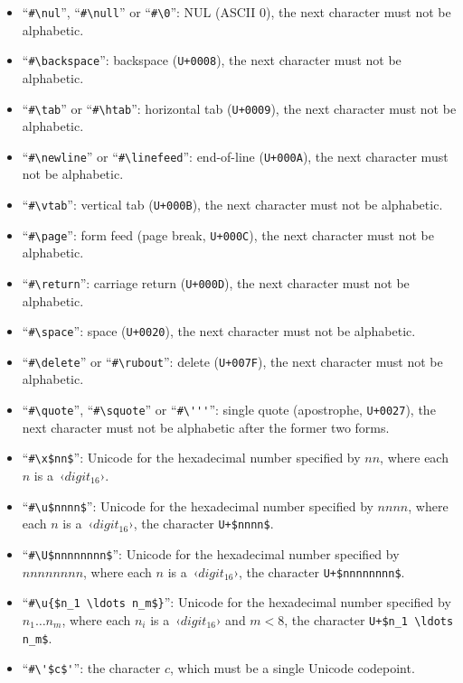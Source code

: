 \begin{itemize}
  \item ``\lstinline!#\nul!'', ``\lstinline!#\null!'' or ``\lstinline!#\0!'': NUL (ASCII 0), the next character must not be alphabetic.
  \item ``\lstinline!#\backspace!'': backspace (\lstinline!U+0008!), the next character must not be alphabetic.
  \item ``\lstinline!#\tab!'' or ``\lstinline!#\htab!'': horizontal tab (\lstinline!U+0009!), the next character must not be alphabetic.
  \item ``\lstinline!#\newline!'' or ``\lstinline!#\linefeed!'': end-of-line (\lstinline!U+000A!), the next character must not be alphabetic.
  \item ``\lstinline!#\vtab!'': vertical tab (\lstinline!U+000B!), the next character must not be alphabetic.
  \item ``\lstinline!#\page!'': form feed (page break, \lstinline!U+000C!), the next character must not be alphabetic.
  \item ``\lstinline[deletekeywords={return}]!#\return!'': carriage return (\lstinline!U+000D!), the next character must not be alphabetic.
  \item ``\lstinline!#\space!'': space (\lstinline!U+0020!), the next character must not be alphabetic.
  \item ``\lstinline!#\delete!'' or ``\lstinline!#\rubout!'': delete (\lstinline!U+007F!), the next character must not be alphabetic.
  \item ``\lstinline!#\quote!'', ``\lstinline!#\squote!'' or ``\lstinline!#\'''!'': single quote (apostrophe, \lstinline!U+0027!), the next character must not be alphabetic after the former two forms.

  \item ``\lstinline!#\x$nn$!'': Unicode for the hexadecimal number specified by $nn$, where each $n$ is a~‹$digit_{16}$›.
  \item ``\lstinline!#\u$nnnn$!'': Unicode for the hexadecimal number specified by $nnnn$, where each $n$ is a~‹$digit_{16}$›, the character \lstinline!U+$nnnn$!.
  \item ``\lstinline!#\U$nnnnnnnn$!'': Unicode for the hexadecimal number specified by $nnnnnnnn$, where each $n$ is a~‹$digit_{16}$›, the character \lstinline!U+$nnnnnnnn$!.
  
  \item ``\lstinline!#\u{$n_1 \ldots n_m$}!'': Unicode for the hexadecimal number specified by $n_1 \ldots n_m$, where each $n_i$ is a~‹$digit_{16}$› and $m < 8$, the character \lstinline!U+$n_1 \ldots n_m$!.
  
  \item ``\lstinline!#\'$c$'!'': the character $c$, which must be a single Unicode codepoint.
\end{itemize}




